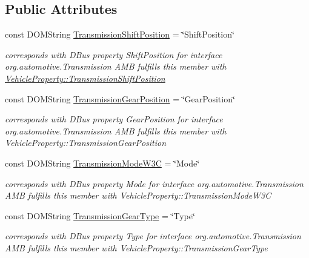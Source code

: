 \subsection*{Public Attributes}
\begin{DoxyCompactItemize}
\item 
\hypertarget{interfaceTransmission_a749c8273349cd7689858ed24217049b1}{const D\+O\+M\+String \hyperlink{interfaceTransmission_a749c8273349cd7689858ed24217049b1}{Transmission\+Shift\+Position} = \char`\"{}Shift\+Position\char`\"{}}\label{interfaceTransmission_a749c8273349cd7689858ed24217049b1}

\begin{DoxyCompactList}\small\item\em corresponds with D\+Bus property Shift\+Position for interface org.\+automotive.\+Transmission A\+M\+B fulfills this member with \hyperlink{classVehicleProperty_ae486d9ea26918460822086b797018800}{Vehicle\+Property\+::\+Transmission\+Shift\+Position} \end{DoxyCompactList}\item 
const D\+O\+M\+String \hyperlink{interfaceTransmission_a0271138d40b3619ffcbfe32f2081d516}{Transmission\+Gear\+Position} = \char`\"{}Gear\+Position\char`\"{}
\begin{DoxyCompactList}\small\item\em corresponds with D\+Bus property Gear\+Position for interface org.\+automotive.\+Transmission A\+M\+B fulfills this member with Vehicle\+Property\+::\+Transmission\+Gear\+Position \end{DoxyCompactList}\item 
\hypertarget{interfaceTransmission_a5f02d4b865d13144dbbff4ca10e731b7}{const D\+O\+M\+String \hyperlink{interfaceTransmission_a5f02d4b865d13144dbbff4ca10e731b7}{Transmission\+Mode\+W3\+C} = \char`\"{}Mode\char`\"{}}\label{interfaceTransmission_a5f02d4b865d13144dbbff4ca10e731b7}

\begin{DoxyCompactList}\small\item\em corresponds with D\+Bus property Mode for interface org.\+automotive.\+Transmission A\+M\+B fulfills this member with Vehicle\+Property\+::\+Transmission\+Mode\+W3\+C \end{DoxyCompactList}\item 
\hypertarget{interfaceTransmission_afdd88c1d4eefa241b0ae1e444c8a7ed6}{const D\+O\+M\+String \hyperlink{interfaceTransmission_afdd88c1d4eefa241b0ae1e444c8a7ed6}{Transmission\+Gear\+Type} = \char`\"{}Type\char`\"{}}\label{interfaceTransmission_afdd88c1d4eefa241b0ae1e444c8a7ed6}

\begin{DoxyCompactList}\small\item\em corresponds with D\+Bus property Type for interface org.\+automotive.\+Transmission A\+M\+B fulfills this member with Vehicle\+Property\+::\+Transmission\+Gear\+Type \end{DoxyCompactList}\end{DoxyCompactItemize}


